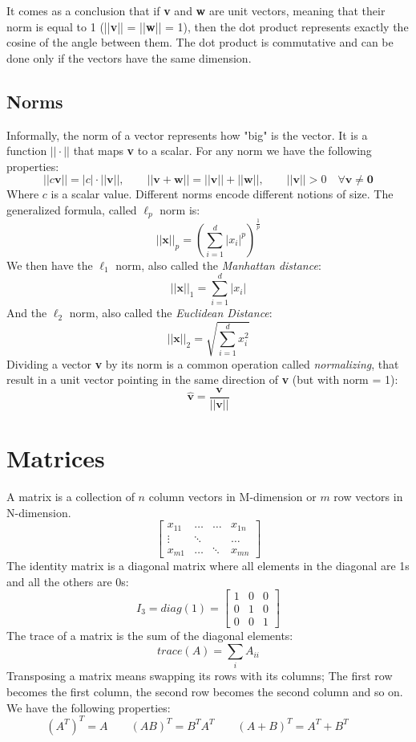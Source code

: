 \documentclass[
	11pt, %
	fleqn, %
	a4paper, %
]{LegrandOrangeBook}
\begin{document}
It comes as a conclusion that if \textbf{v} and \textbf{w} are unit vectors, meaning that their norm is equal to 1 (||\textbf{v}|| = ||\textbf{w}|| = 1), then the dot product represents exactly the cosine of the angle between them. The dot product is commutative and can be done only if the vectors have the same dimension.

\subsection{Norms}
Informally, the norm of a vector represents how "big" is the vector. It is a function $||\cdot||$ that maps \textbf{v} to a scalar. For any norm we have the following properties:
$$||c\textbf{v}|| = |c| \cdot ||\textbf{v}||, \qquad ||\textbf{v} + \textbf{w}|| = ||\textbf{v}|| + || \textbf{w}||, \qquad ||\textbf{v}|| > 0 \quad \forall \textbf{v} \neq \textbf{0}$$
Where $c$ is a scalar value. Different norms encode different notions of size. The generalized formula, called $\ell_p$ norm is:
$$||\textbf{x}||_p = (\sum_{i = 1}^{d}|x_i|^p)^{\frac{1}{p}}$$
We then have the $\ell_1$ norm, also called the \emph{Manhattan distance}:
$$ ||\textbf{x}||_1 = \sum_{i=1}^{d}|x_i|$$
And the $\ell_2$ norm, also called the \emph{Euclidean Distance}:
$$ ||\textbf{x}||_2 = \sqrt{\sum_{i=1}^{d}x_i^2}$$
Dividing a vector \textbf{v} by its norm is a common operation called \emph{normalizing}, that result in a unit vector pointing in the same direction of \textbf{v} (but with norm = 1):
$$\hat{\textbf{v}} = \frac{\textbf{v}}{||\textbf{v}||}$$

\section{Matrices}
A matrix is a collection of $n$ column vectors in M-dimension or $m$ row vectors in N-dimension.
$$
	\begin{bmatrix}
		x_{11} & \hdots & \hdots & x_{1n} \\
		\vdots & \ddots &        & \hdots \\
		x_{m1} & \hdots & \ddots & x_{mn}
	\end{bmatrix}
$$
The identity matrix is a diagonal matrix where all elements in the diagonal are 1s and all the others are 0s:
$$ I_3 = diag(1) =
	\begin{bmatrix}
		1 & 0 & 0 \\
		0 & 1 & 0 \\
		0 & 0 & 1
	\end{bmatrix}
$$
The trace of a matrix is the sum of the diagonal elements:
$$trace(A) = \sum_{i}A_{ii}$$
Transposing a matrix means swapping its rows with its columns; The first row becomes the first column, the second row becomes the second column and so on. We have the following properties:
$$(A^T)^T = A \qquad (AB)^T = B^T A^T \qquad (A + B)^T = A^T + B^T \qquad $$
\end{document}
